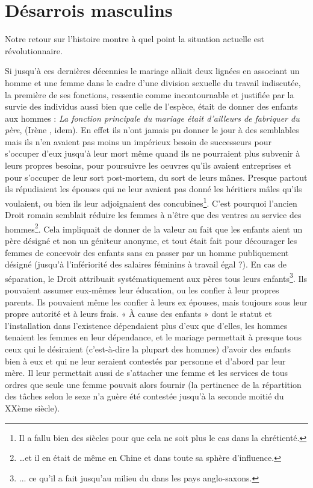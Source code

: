 
\chapter{Désarrois masculins}


 Notre retour sur l'histoire montre à quel point la situation actuelle est révolutionnaire. 

 Si jusqu'à ces dernières décennies le mariage alliait deux lignées en associant un homme et une femme dans le cadre d'une division sexuelle du travail indiscutée, la première de ses fonctions, ressentie comme incontournable et justifiée par la survie des individus aussi bien que celle de l'espèce, était de donner des enfants aux hommes :
\emph{La fonction principale du mariage était d'ailleurs de fabriquer du père}, (Irène , idem). En effet ils n'ont jamais pu donner le jour à des semblables mais ils n'en avaient pas moins un impérieux besoin de successeurs pour s'occuper d'eux jusqu'à leur mort même quand ils ne pourraient plus subvenir à leurs propres besoins, pour poursuivre les oeuvres qu'ils avaient entreprises et pour s'occuper de leur sort post-mortem, du sort de leurs mânes.  Presque partout ils répudiaient les épouses qui ne leur avaient pas donné les héritiers mâles qu'ils voulaient, ou bien ils leur adjoignaient des concubines\footnote{Il a fallu bien des siècles pour que cela ne soit plus le cas dans la chrétienté.}. C'est pourquoi l'ancien Droit romain semblait réduire les femmes à n'être que des ventres au service des hommes\footnote{…et il en était de même en Chine et dans toute sa sphère d'influence.}. Cela impliquait de donner de la valeur au fait que les enfants aient un père désigné et non un géniteur anonyme, et tout était fait pour décourager les femmes de concevoir des enfants sans en passer par un homme publiquement désigné (jusqu'à l'infériorité des salaires féminins à travail égal ?). En cas de séparation, le Droit attribuait systématiquement aux pères tous leurs enfants\footnote{... ce qu'il a fait jusqu'au milieu du  dans les pays anglo-saxons.}. Ils pouvaient assumer eux-mêmes leur éducation, ou les confier à leur propres parents. Ils pouvaient même les confier à leurs ex épouses, mais toujours sous leur propre autorité et à leurs frais. « À cause des enfants » dont le statut et l'installation dans l'existence dépendaient plus d'eux que d'elles, les hommes tenaient les femmes en leur dépendance, et le mariage permettait à presque tous ceux qui le désiraient (c'est-à-dire la plupart des hommes) d'avoir des enfants bien à eux et qui ne leur seraient contestés par personne et d'abord par leur mère. Il leur permettait aussi de s'attacher une femme et les services de tous ordres que seule une femme pouvait alors fournir (la pertinence de la répartition des tâches selon le sexe n'a guère été contestée jusqu'à la seconde moitié du XXème siècle). 
 
